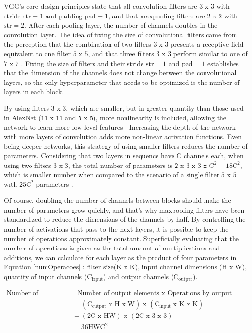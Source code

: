 VGG's core design principles state that all convolution filters are $3\text{ x }3$ with stride $\text{str} = 1$ and padding $\text{pad} = 1$, and that maxpooling filters are $2\text{ x }2$ with $\text{str} = 2$. After each pooling layer, the number of channels doubles in the convolution layer. The idea of fixing the size of convolutional filters came from the perception that the combination of two filters $3\text{ x }3$ presents a receptive field equivalent to one filter $5\text{ x }5$, and that three filters $3\text{ x }3$ perform similar to one of $7\text{ x }7$ \cite{elgendy2020}. Fixing the size of filters and their stride $\text{str} = 1$ and $\text{pad} = 1$ establishes that the dimension of the channels does not change between the convolutional layers, so the only hyperparameter that needs to be optimized is the number of layers in each block.

By using filters $3\text{ x }3$, which are smaller, but in greater quantity than those used in AlexNet ($11\text{ x }11$ and $5\text{ x }5$), more nonlinearity is included, allowing the network to learn more low-level features \cite{elgendy2020}. Increasing the depth of the network with more layers of convolution adds more non-linear activation functions. Even being deeper networks, this strategy of using smaller filters reduces the number of parameters. Considering that two layers in sequence have C channels each, when using two filters $3\text{ x }3$, the total number of parameters is $2\text{ x }3\text{ x }3\text{ x }\text{C}^2 = 18\text{C}^2$, which is smaller number when compared to the scenario of a single filter $5\text{ x }5$ with $25\text{C}^2$ parameters \cite{johnson2019}.

Of course, doubling the number of channels between blocks should make the number of parameters grow quickly, and that's why maxpooling filters have been standardized to reduce the dimensions of the channels by half. By controlling the number of activations that pass to the next layers, it is possible to keep the number of operations approximately constant. Superficially evaluating that the number of operations is given as the total amount of multiplications and additions, we can calculate for each layer as the product of four parameters in Equation \ref{numOperacoes} \cite{johnson2019}: filter size($\text{K x K}$), input channel dimensions ($\text{H x W}$), quantity of input channels ($\text{C}_{\text{input}}$) and output channels ($\text{C}_{\text{output}}$).

\begin{equation}
\begin{split}
  \text{Number of operations} &= \text{Number of output elements x Operations by output element}\\
  &= (\text{C}_{\text{output}} \text{ x H x W}) \text{ x } (\text{C}_{\text{input}} \text{ x K x K})\\
  &= (2\text{C x HW}) \text{ x } (\text{2C x 3 x 3})\\
  &= 36 \text{HWC}^2
\end{split}
\label{numOperacoes}
\end{equation}

